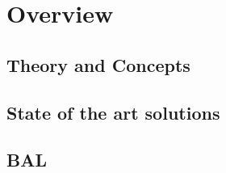 



\section{Overview}

\subsection{Theory and Concepts}
 

\subsection{State of the art solutions} 












\subsection{BAL} 

 

